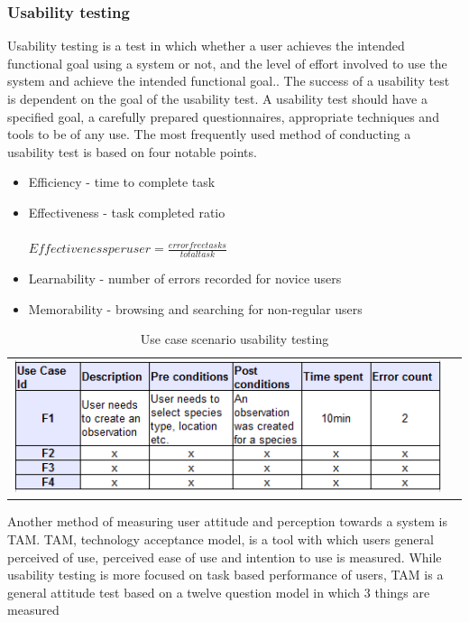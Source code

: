 \subsubsection{Usability testing}
Usability testing is a test in which whether a user achieves the intended functional goal using a system or not, and the level of effort involved to use the system and achieve the intended functional goal.\cite{iso:9126}. The success of a usability test is dependent on the goal of the usability test. A usability test should have a specified goal, a carefully prepared questionnaires, appropriate techniques and tools to be of any use. The most frequently used method of conducting a usability test is based on four notable points\cite{usability:doc2}\cite{usability:doc3}.

\begin{itemize}
\item Efficiency - time to complete task

\item Effectiveness - task completed ratio \\ \\ $Effectiveness per user=\frac{error free tasks}{total task}$
\item Learnability - number of errors recorded for novice users
\item Memorability - browsing and searching for non-regular users
\end{itemize}

\begin{table}[htb]
        \caption{Use case scenario usability testing\cite{tam:doc5}}
        \centering
        \begin{tabular}{cc}
        \includegraphics[scale=0.91]{reqspec/usabilitytable.png}
        \end{tabular}
        \label{tab:usecaseusability}
    \end{table}

Another method of measuring user attitude and perception towards a system is TAM.
TAM, technology acceptance model, is a tool with which users general perceived of use, perceived ease of use and intention to use is measured. While usability testing is more focused on  task based performance of users\cite{tam:doc4}, TAM is a general attitude test based on a twelve question model in which 3 things are measured

